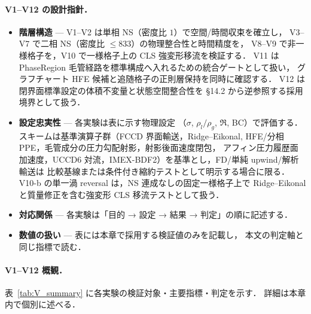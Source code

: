 \paragraph{V1--V12 の設計指針．}
\begin{itemize}\setlength{\itemsep}{0pt}
  \item \textbf{階層構造} — V1--V2 は単相 NS（密度比 $1$）で空間/時間収束を確立し，
        V3--V7 で二相 NS（密度比 $\le 833$）の物理整合性と時間精度を，
        V8--V9 で非一様格子を，V10 で一様格子上の CLS 強変形移流を検証する．
        V11 は PhaseRegion 毛管経路を標準構成へ入れるための統合ゲートとして扱い，
        グラフチャート HFE 候補と追随格子の正則層保持を同時に確認する．
        V12 は閉界面標準設定の体積不変量と状態空間整合性を
        §14.2 から逆参照する採用境界として扱う．
  \item \textbf{設定忠実性} — 各実験は表に示す物理設定
        （$\sigma$, $\rho_l/\rho_g$, $\Re$, BC）で評価する．
        スキームは基準演算子群（FCCD 界面輸送，Ridge--Eikonal,
        HFE/分相 PPE，毛管成分の圧力勾配射影，射影後面速度閉包，
        アフィン圧力履歴面加速度，UCCD6 対流，IMEX-BDF2）を基準とし，FD/単純 upwind/解析輸送は
        比較基線または条件付き縮約テストとして明示する場合に限る．
        V10-b の単一渦 reversal は，NS 連成なしの固定一様格子上で Ridge--Eikonal と質量修正を含む強変形 CLS 移流テストとして扱う．
  \item \textbf{対応関係} — 各実験は「目的 → 設定 → 結果 → 判定」の順に記述する．
  \item \textbf{数値の扱い} — 表には本章で採用する検証値のみを記載し，
        本文の判定軸と同じ指標で読む．
\end{itemize}

\paragraph{V1--V12 概観．}
表~\ref{tab:V_summary} に各実験の検証対象・主要指標・判定を示す．
詳細は本章内で個別に述べる．

